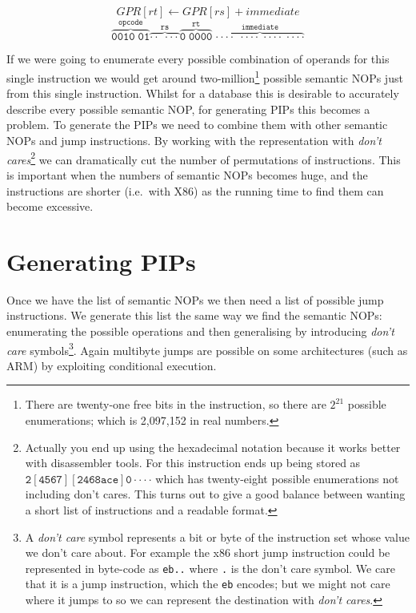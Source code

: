 \documentclass[10pt,]{book}
\begin{document}
\[GPR[rt] \gets GPR[rs] + immediate\]
\[\mathtt{\overbrace{0010\;01}^\text{opcode}
\overbrace{\cdot\cdot\;\cdot\cdot\cdot}^\text{rs}
\overbrace{0\;0000}^\text{rt}\; \overbrace{\cdot\cdot\cdot\cdot\;
\cdot\cdot\cdot\cdot\; \cdot\cdot\cdot\cdot\;
\cdot\cdot\cdot\cdot}^\text{immediate}}\]

If we were going to enumerate every possible combination of operands for
this single instruction we would get around two-million\footnote{There
  are twenty-one free bits in the instruction, so there are $2^{21}$
  possible enumerations; which is 2,097,152 in real numbers.} possible
semantic NOPs just from this single instruction. Whilst for a database
this is desirable to accurately describe every possible semantic NOP,
for generating PIPs this becomes a problem. To generate the PIPs we need
to combine them with other semantic NOPs and jump instructions. By
working with the representation with \emph{don't cares}\footnote{Actually
  you end up using the hexadecimal notation because it works better with
  disassembler tools. For this instruction ends up being stored as
  $\mathtt{2[4567][2468ace]0\cdot\cdot\cdot\cdot}$ which has
  twenty-eight possible enumerations not including don't cares. This
  turns out to give a good balance between wanting a short list of
  instructions and a readable format.} we can dramatically cut the
number of permutations of instructions. This is important when the
numbers of semantic NOPs becomes huge, and the instructions are shorter
(i.e.~with X86) as the running time to find them can become excessive.

\section{Generating PIPs}

Once we have the list of semantic NOPs we then need a list of possible
jump instructions. We generate this list the same way we find the
semantic NOPs: enumerating the possible operations and then generalising
by introducing \emph{don't care} symbols\footnote{A \emph{don't care}
  symbol represents a bit or byte of the instruction set whose value we
  don't care about. For example the x86 short jump instruction could be
  represented in byte-code as \lstinline!eb..! where \lstinline!.! is
  the don't care symbol. We care that it is a jump instruction, which
  the \lstinline!eb! encodes; but we might not care where it jumps to so
  we can represent the destination with \emph{don't cares}.}. Again
multibyte jumps are possible on some architectures (such as ARM) by
exploiting conditional execution.
\end{document}

